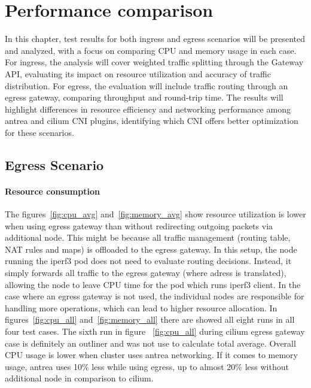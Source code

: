 \chapter{Performance comparison}
\label{cha:performCompare}

In this chapter, test results for both ingress and egress scenarios will be presented and analyzed, with a focus on comparing CPU and memory usage in each case. For ingress, the analysis will cover weighted traffic splitting through the Gateway API, evaluating its impact on resource utilization and accuracy of traffic distribution. For egress, the evaluation will include traffic routing through an egress gateway, comparing throughput and round-trip time. The results will highlight differences in resource efficiency and networking performance among antrea and cilium CNI plugins, identifying which CNI offers better optimization for these scenarios.


\section{Egress Scenario}
\label{sec:egressComparison}

\subsubsection{Resource consumption}
\label{sec:egressResoureComsumption}



The figures~\ref{fig:cpu_avg} and~\ref{fig:memory_avg} show resource utilization is lower when using egress gateway than without redirecting outgoing packets via additional node. This might be because all traffic management (routing table, NAT rules and maps) is offloaded to the egress gateway. In this setup, the node running the iperf3 pod does not need to evaluate routing decisions. Instead, it simply forwards all traffic to the egress gateway (where adress is translated), allowing the node to leave CPU time for the pod which runs iperf3 client. In the case where an egress gateway is not used, the individual nodes are responsible for handling more operations, which can lead to higher resource allocation. In figures~\ref{fig:cpu_all} and~\ref{fig:memory_all} there are showed all eight runs in all four test cases. The sixth run in figure ~\ref{fig:cpu_all} during cilium egress gateway case is definitely an outliner and was not use to calculate total average. Overall CPU usage is lower when cluster uses antrea networking. If it comes to memory usage, antrea uses 10\% less while using egress, up to almost 20\% less without additional node in comparison to cilium.

